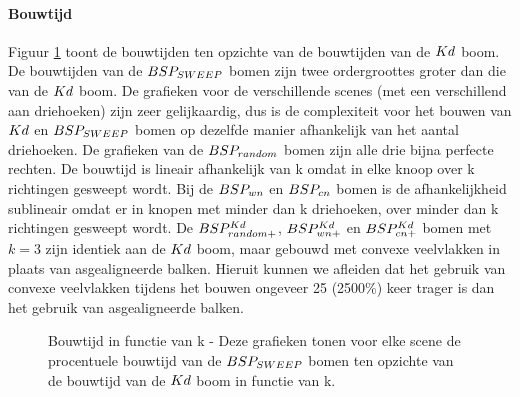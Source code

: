 \paragraph{Bouwtijd} Figuur \ref{fig:k-bouwtijd} toont de bouwtijden ten opzichte van de bouwtijden van de $Kd$ boom. De bouwtijden van de $BSP_{SWEEP}$ bomen zijn twee ordergroottes groter dan die van de $Kd$ boom. De grafieken voor de verschillende scenes (met een verschillend aan driehoeken) zijn zeer gelijkaardig, dus is de complexiteit voor het bouwen van $Kd$ en $BSP_{SWEEP}$ bomen op dezelfde manier afhankelijk van het aantal driehoeken. De grafieken van de $BSP_{random}$ bomen zijn alle drie bijna perfecte rechten. De bouwtijd is lineair afhankelijk van k omdat in elke knoop over k richtingen gesweept wordt. Bij de $BSP_{wn}$ en $BSP_{cn}$ bomen is de afhankelijkheid sublineair omdat er in knopen met minder dan k driehoeken, over minder dan k richtingen gesweept wordt. 
De $BSP^{Kd}_{random+}$, $BSP^{Kd}_{wn+}$ en $BSP^{Kd}_{cn+}$ bomen met $k = 3$ zijn identiek aan de $Kd$ boom, maar gebouwd met convexe veelvlakken in plaats van asgealigneerde balken.
Hieruit kunnen we afleiden dat het gebruik van convexe veelvlakken tijdens het bouwen ongeveer 25 (2500\%) keer trager is dan het gebruik van asgealigneerde balken.
\begin{figure}[h]
  \centering
  \begin{subfigure}[t]{.32\linewidth}
    \centering
{}
  \end{subfigure}
  \begin{subfigure}[t]{.32\linewidth}
    \centering
{}
\end{subfigure}
\begin{subfigure}[t]{.32\linewidth}
  \centering
{}
\end{subfigure}
\caption[Bouwtijd in functie van k]{Bouwtijd in functie van k - \small Deze grafieken tonen voor elke scene de procentuele bouwtijd van de $BSP_{SWEEP}$ bomen ten opzichte van de bouwtijd van de $Kd$ boom in functie van k.}
\label{fig:k-bouwtijd}
\end{figure}


